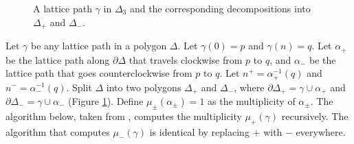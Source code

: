 \documentclass{amsart}
\begin{document}
\begin{figure}[h]
\caption{A lattice path $\gamma$ in $\Delta_3$ and the corresponding decompositions into $\Delta_+$ and $\Delta_-$.} 
\label{lattice_p1}
\end{figure}    
\FloatBarrier


 Let $\gamma$ be any lattice path in a polygon $\Delta$. Let $\gamma(0)=p$ and $\gamma(n)=q$. Let $\alpha_+$ be the lattice path along $\partial \Delta$ that travels clockwise from $p$ to $q$, and $\alpha_-$ be the lattice path that goes counterclockwise from $p$ to $q$. Let $n^+=\alpha_+^{-1}(q)$ and $n^-=\alpha_-^{-1}(q)$. Split $\Delta$ into two polygons $\Delta_+$ and $\Delta_-$, where $\partial \Delta_+=\gamma \cup \alpha_+$ and $\partial \Delta_-=\gamma \cup \alpha_-$ (Figure \ref{lattice_p1}). Define $\mu_{\pm}(\alpha_{\pm})=1$ as the multiplicity of $\alpha_{\pm}$. The algorithm below, taken from \cite{MikCountingCurvesLatticePaths}, computes the multiplicity $\mu_+(\gamma)$ recursively. The algorithm that computes $\mu_-(\gamma)$ is identical by replacing $+$ with $-$ everywhere.
\end{document}
